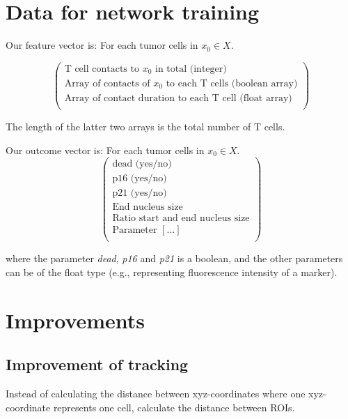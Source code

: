 \documentclass{report}
\begin{document}
\section{Data for network training}

Our feature vector is: For each tumor cells in $x_0 \in X$.

\begin{equation*}
	\begin{pmatrix}
		\text{T cell contacts to } x_0  \text{ in total (integer)}	\\
		\text{Array of contacts of } x_0 \text{ to each T cells (boolean array)}\\
		\text{Array of contact duration to each T cell (float array)} \\
	\end{pmatrix}
\end{equation*}

The length of the latter two arrays is the total number of T cells.

Our outcome vector is: For each tumor cells in $x_0 \in X$.
\begin{equation*}
 \left(
	\begin{array}{c}
		\text{dead (yes/no)} \\
		\text{p16 (yes/no)}		\\
		\text{p21 (yes/no)}		\\
		\text{End nucleus size}		\\
		\text{Ratio start and end nucleus size}		\\
		\text{Parameter } [\dots]		\\
	\end{array}
\right) 
\end{equation*}

where the parameter \textit{dead},  \textit{p16} and \textit{p21} is a boolean, and the other parameters can be of the float type (e.g., representing fluorescence intensity of a marker).


\section{Improvements}

\subsection{Improvement of tracking}
Instead of calculating the distance between xyz-coordinates where one xyz-coordinate represents one cell, calculate the distance between ROIs.
\end{document}
